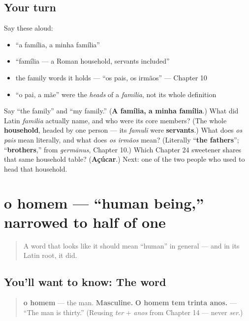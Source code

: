 \subsection*{Your turn}
Say these aloud:

\begin{itemize}
\raggedright
  \item \textquotedblleft{}a família, a minha família\textquotedblright{}
  \item \textquotedblleft{}família — a Roman household, servants included\textquotedblright{}
  \item the family words it holds — \textquotedblleft{}os pais, os irmãos\textquotedblright{} — Chapter 10
  \item \textquotedblleft{}o pai, a mãe\textquotedblright{} were the \emph{heads} of a \emph{familia}, not its whole definition
\end{itemize}

\begin{tcolorbox}[breakable,colback=teal!4,colframe=teal!35!black,title={Before you move on}]
Say \textquotedblleft{}the family\textquotedblright{} and \textquotedblleft{}my family.\textquotedblright{} (\textbf{A família, a minha família}.) What did Latin \emph{familia} actually name, and who were its core members? (The whole \textbf{household}, headed by one person — its \emph{famuli} were \textbf{servants}.) What does \emph{os pais} mean literally, and what does \emph{os irmãos} mean? (Literally \textquotedblleft{}\textbf{the fathers}\textquotedblright{}; \textquotedblleft{}\textbf{brothers},\textquotedblright{} from \emph{germānus}, Chapter 10.) Which Chapter 24 sweetener shares that same household table? (\textbf{Açúcar}.) Next: one of the two people who used to head that household.
\end{tcolorbox}
\section[o homem]{o homem — \textquotedblleft{}human being,\textquotedblright{} narrowed to half of one}

\label{lesson:PT-C25-homem}



\begin{quote}
A word that looks like it should mean \textquotedblleft{}human\textquotedblright{} in general — and in its Latin root, it did.
\end{quote}

\subsection*{You'll want to know: The word}
\begin{quote}
\textbf{o homem} — the man. \textbf{Masculine.} \textbf{O homem tem trinta anos.} — \textquotedblleft{}The man is thirty.\textquotedblright{} (Reusing \emph{ter} + \emph{anos} from Chapter 14 — never \emph{ser}.)
\end{quote}

